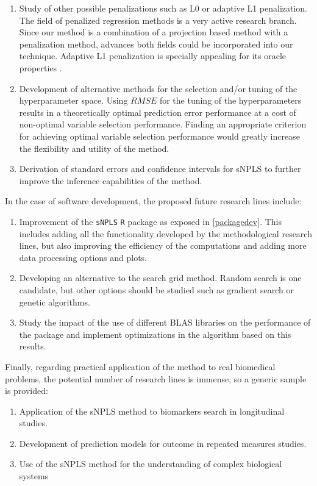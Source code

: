 \begin{enumerate}
    \item Study of other possible penalizations such as L0 or adaptive L1 penalization. The field of penalized regression methods is a very active research branch. Since our method is a combination of a projection based method with a penalization method, advances both fields could be incorporated into our technique. Adaptive L1 penalization is specially appealing for its oracle properties \parencite{zou2006adaptive}.
    \item Development of alternative methods for the selection and/or tuning of the hyperparameter space. Using $RMSE$ for the tuning of the hyperparameters results in a theoretically optimal prediction error performance at a cost of non-optimal variable selection performance. Finding an appropriate criterion for achieving optimal variable selection performance would greatly increase the flexibility and utility of the method.
    \item Derivation of standard errors and confidence intervals for sNPLS to further improve the inference capabilities of the method.
\end{enumerate}
\vspace{10pt}
In the case of software development, the proposed future research lines include:

\begin{enumerate}
    \item Improvement of the \texttt{sNPLS} \texttt{R} package as exposed in \autoref{packagedev}. This includes adding all the functionality developed by the methodological research lines, but also improving the efficiency of the computations and adding more data processing options and plots.
    \item Developing an alternative to the search grid method. Random search is one candidate, but other options should be studied such as gradient search or genetic algorithms.
    \item Study the impact of the use of different BLAS libraries on the performance of the package and implement optimizations in the algorithm based on this results.
\end{enumerate}
\vspace{10pt}
Finally, regarding practical application of the method to real biomedical problems, the potential number of research lines is immense, so a generic sample is provided:

\begin{enumerate}
    \item Application of the sNPLS method to biomarkers search in longitudinal studies.
    \item Development of prediction models for outcome in repeated measures studies.
    \item Use of the sNPLS method for the understanding of complex biological systems
\end{enumerate}
